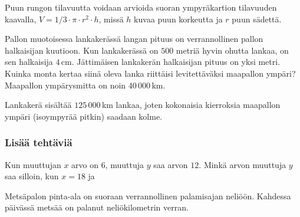 \begin{tehtavasivu}
\begin{tehtava}
	Puun rungon tilavuutta voidaan arvioida suoran ympyräkartion tilavuuden kaavalla, $V = 1/3\cdot\pi \cdot r^2\cdot h$, missä $h$ kuvaa puun korkeutta ja $r$ puun sädettä.
	\begin{vastaus}
	\end{vastaus}
\end{tehtava}

\begin{tehtava}
Pallon muotoisessa lankakerässä langan pituus on verrannollinen pallon halkaisijan kuutioon. Kun lankakerässä on $500$ metriä hyvin ohutta lankaa, on sen halkaisija $4$\,cm. Jättimäisen lankakerän halkaisijan pituus on yksi metri. Kuinka monta kertaa siinä oleva lanka riittäisi levitettäväksi maapallon ympäri? Maapallon ympärysmitta on noin $40\,000$\,km.
	\begin{vastaus}
Lankakerä sisältää $125\,000$\,km lankaa, joten kokonaisia kierroksia maapallon ympäri (isoympyrää pitkin) saadaan kolme.
	\end{vastaus}
\end{tehtava}

\subsubsection*{Lisää tehtäviä}

\begin{tehtava}
Kun muuttujan $x$ arvo on $6$, muuttuja $y$ saa arvon $12$. Minkä arvon muuttuja $y$ saa silloin, kun $x=18$ ja
	\begin{vastaus}
	\end{vastaus}
\end{tehtava}

\begin{tehtava}
	Metsäpalon pinta-ala on suoraan verrannollinen palamisajan neliöön. Kahdessa päivässä metsää on palanut neliökilometrin verran. 
	\begin{vastaus}
	\end{vastaus}
\end{tehtava}


\end{tehtavasivu}
